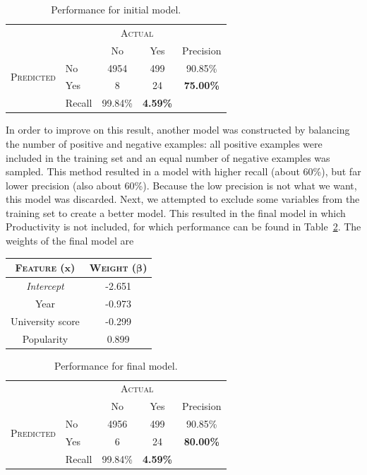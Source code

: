 \begin{table}
\centering
\begin{tabular}{c|l|c|c|c}
\multicolumn{2}{c|}{} & \multicolumn{2}{c|}{\textsc{Actual}}&\\ \cline{3-4}
\multicolumn{2}{c|}{\rule{0pt}{4mm}} &No&Yes&Precision\\ \hline
\multirow{2}{*}{\textsc{Predicted}}&\rule{0pt}{4mm}No&4954&499&90.85\%\\ \cline{2-5}
\rule{0pt}{4mm}&Yes&8&24&\textbf{75.00\%}\\ \hline
&\rule{0pt}{4mm}Recall&99.84\%&\textbf{4.59\%}&\\
\end{tabular}
\caption{Performance for initial model.}
\label{tbl:initialPerformance}
\end{table}

In order to improve on this result, another model was constructed by balancing the number of positive and negative examples: all positive examples were included in the training set and an equal number of negative examples was sampled. This method resulted in a model with higher recall (about 60\%), but far lower precision (also about 60\%). Because the low precision is not what we want, this model was discarded. Next, we attempted to exclude some variables from the training set to create a better model. This resulted in the final model in which Productivity is not included, for which performance can be found in Table~\ref{tbl:resultingPerformance}. The weights of the final model are
\begin{table}[H]
\centering
\begin{tabular}{c|c}
\textsc{\textbf{Feature}} ($\mathbf{x}$) & \textsc{\textbf{Weight}} ($\boldsymbol{\beta}$)\\ \hline
\rule{0pt}{4mm}\emph{Intercept}&-2.651\\
Year&-0.973\\
University score&-0.299\\
Popularity&0.899\\
\end{tabular}
\end{table}


\begin{table}
\centering
\begin{tabular}{c|l|c|c|c}
\multicolumn{2}{c|}{} & \multicolumn{2}{c|}{\textsc{Actual}}&\\ \cline{3-4}
\multicolumn{2}{c|}{\rule{0pt}{4mm}} &No&Yes&Precision\\ \hline
\multirow{2}{*}{\textsc{Predicted}}&\rule{0pt}{4mm}No&4956&499&90.85\%\\ \cline{2-5}
\rule{0pt}{4mm}&Yes&6&24&\textbf{80.00\%}\\ \hline
&\rule{0pt}{4mm}Recall&99.84\%&\textbf{4.59\%}&\\
\end{tabular}
\caption{Performance for final model.}
\label{tbl:resultingPerformance}
\end{table}
